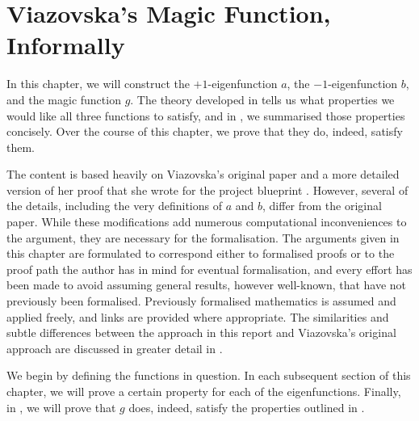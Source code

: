 \chapter{Viazovska's Magic Function, Informally}
\label{Ch4:Chapter}

In this chapter, we will construct the $+1$-eigenfunction $a$, the $-1$-eigenfunction $b$, and the magic function $g$. The theory developed in  tells us what properties we would like all three functions to satisfy, and in , we summarised those properties concisely. Over the course of this chapter, we prove that they do, indeed, satisfy them.

The content is based heavily on Viazovska's original paper \cite{Viazovska8} and a more detailed version of her proof that she wrote for the project blueprint \cite{blueprint}. However, several of the details, including the very definitions of $a$ and $b$, differ from the original paper. While these modifications add numerous computational inconveniences to the argument, they are necessary for the formalisation. The arguments given in this chapter are formulated to correspond either to formalised proofs or to the proof path the author has in mind for eventual formalisation, and every effort has been made to avoid assuming general results, however well-known, that have not previously been formalised. Previously formalised mathematics is assumed and applied freely, and links are provided where appropriate. The similarities and subtle differences between the approach in this report and Viazovska's original approach are discussed in greater detail in .

We begin by defining the functions in question. In each subsequent section of this chapter, we will prove a certain property for each of the eigenfunctions. Finally, in , we will prove that $g$ does, indeed, satisfy the properties outlined in .






